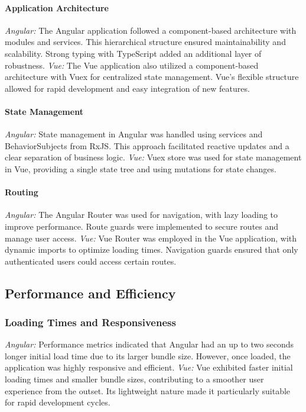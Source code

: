 \documentclass[conference]{IEEEtran}
\begin{document}
\paragraph{Application Architecture}
\textit{Angular: }The Angular application followed a component-based architecture with modules and services. This hierarchical structure ensured maintainability and scalability. Strong typing with TypeScript added an additional layer of robustness.
\newline\textit{Vue: }The Vue application also utilized a component-based architecture with Vuex for centralized state management. Vue's flexible structure allowed for rapid development and easy integration of new features.
\paragraph{State Management}
\textit{Angular: }State management in Angular was handled using services and BehaviorSubjects from RxJS. This approach facilitated reactive updates and a clear separation of business logic.
\newline\textit{Vue: }Vuex store was used for state management in Vue, providing a single state tree and using mutations for state changes.
\paragraph{Routing}
\textit{Angular: }The Angular Router was used for navigation, with lazy loading to improve performance. Route guards were implemented to secure routes and manage user access.
\newline\textit{Vue: }Vue Router was employed in the Vue application, with dynamic imports to optimize loading times. Navigation guards ensured that only authenticated users could access certain routes.

\subsection{Performance and Efficiency}
\subsubsection{Loading Times and Responsiveness}
\textit{Angular: }Performance metrics indicated that Angular had an up to two seconds longer initial load time due to its larger bundle size. However, once loaded, the application was highly responsive and efficient.
\newline\textit{Vue: }Vue exhibited faster initial loading times and smaller bundle sizes, contributing to a smoother user experience from the outset. Its lightweight nature made it particularly suitable for rapid development cycles.
\end{document}
